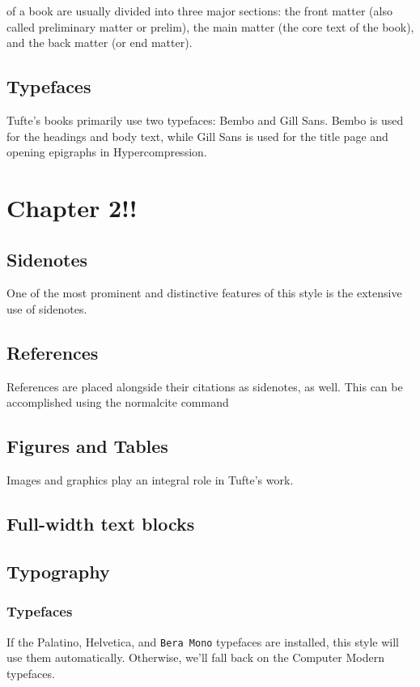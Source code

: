 \documentclass{tufte-book}
\newcommand{\thesis}{Hypercompression\xspace}
\begin{document}
 of a book are usually divided into three major
sections: the front matter (also called preliminary matter or prelim), the
main matter (the core text of the book), and the back matter (or end
matter).

\section{Typefaces}\label{sec:typefaces1}

Tufte's books primarily use two typefaces: Bembo and Gill Sans.  Bembo is used
for the headings and body text, while Gill Sans is used for the title page and
opening epigraphs in \thesis.

\chapter[Chapter2]{Chapter 2!!}
\label{ch:ch2}

\section{Sidenotes}\label{sec:sidenotes}
One of the most prominent and distinctive features of this style is the
extensive use of sidenotes.

\section{References}
References are placed alongside their citations as sidenotes,
as well.  This can be accomplished using the normalcite command

\section{Figures and Tables}\label{sec:figures-and-tables}
Images and graphics play an integral role in Tufte's work.

\section{Full-width text blocks}

\section{Typography}\label{sec:typography}

\subsection{Typefaces}\label{sec:typefaces}
If the Palatino, \textsf{Helvetica}, and \texttt{Bera Mono} typefaces are installed, this style
will use them automatically.  Otherwise, we'll fall back on the Computer Modern
typefaces.
\end{document}
